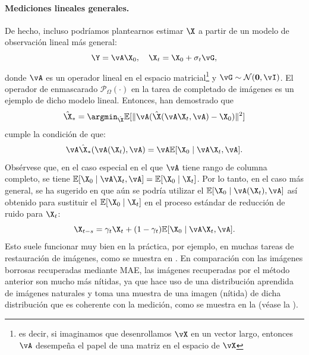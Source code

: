 \documentclass[../../book-main_es.tex]{subfiles}
\begin{document}
\paragraph{Mediciones lineales generales.}
De hecho, incluso podríamos plantearnos estimar $\X$ a partir de un modelo de observación 
lineal más general:
\begin{equation}
    \Y = \vA\X_0,  \quad \X_t = \X_0 + \sigma_t \vG,
\end{equation}
donde $\vA$ es un operador lineal en el espacio matricial\footnote{es decir, si
    imaginamos que desenrollamos \(\vX\) en un vector largo, entonces \(\vA\) desempeña el
papel de una matriz en el espacio de \(\vX\)} y $\vG \sim
\mathcal{N}(\boldsymbol{0}, \vI)$. El operador de enmascarado
$\mathcal{P}_{\Omega}(\cdot)$ en la tarea de completado de imágenes es un
ejemplo de dicho modelo lineal. Entonces, \cite{daras2023ambient} han demostrado que
\begin{equation}
    \hat{\X}_* = \argmin_{\hat{\X}}
    \mathbb{E}[\|\vA(\hat{\X}(\vA\X_t, \vA) - \X_0)\|^2]
\end{equation}
cumple la condición de que:
\begin{equation}
    \vA \hat{\X}_*(\vA(\X_t), \vA) = \vA \mathbb{E}[\X_0 \mid \vA \X_t, \vA].
\end{equation} 
Obsérvese que, en el caso especial en el que $\vA$ tiene rango de columna completo,
se tiene $ \mathbb{E}[\X_0 \mid \vA\X_t, \vA] =
\mathbb{E}[\X_0 \mid \X_t]$. Por lo tanto, en el caso más general, se ha
sugerido en \cite{daras2023ambient} que aún se podría utilizar
el $\mathbb{E}[\X_0 \mid \vA(\X_t), \vA]$ así obtenido para sustituir el
$\mathbb{E}[\X_0 \mid \X_t]$ en el proceso estándar de reducción de ruido para $\X_t$:
\begin{equation}
    \X_{t-s} = \gamma_t \X_t + (1-\gamma_t) \mathbb{E}[\X_0 \mid \vA\X_t, \vA].
\end{equation}
Esto suele funcionar muy bien en la práctica, por ejemplo, en muchas tareas de
restauración de imágenes, como se muestra en \cite{daras2023ambient}. En comparación con
las imágenes borrosas recuperadas mediante MAE, las imágenes recuperadas por el
método anterior son mucho más nítidas, ya que hace uso de una distribución aprendida
de imágenes naturales y toma una muestra de una imagen (nítida) de dicha distribución
que es coherente con la medición, como se muestra en la
 (véase la ).
\end{document}

